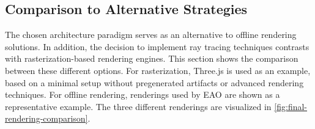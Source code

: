 \subsection*{Comparison to Alternative Strategies}

The chosen architecture paradigm serves as an alternative to offline rendering solutions. In addition, the decision to implement ray tracing techniques contrasts with rasterization-based rendering engines. This section shows the comparison between these different options. For rasterization, \gls{Three.js} is used as an example, based on a minimal setup without pregenerated artifacts or advanced rendering techniques. For offline rendering,  renderings used by EAO are shown as a representative example. The three different renderings are visualized in \autoref{fig:final-rendering-comparison}.

